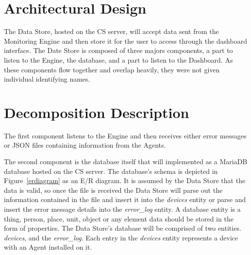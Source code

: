 \documentclass[letterpaper,12pt,oneside,listof=totoc]{scrreprt}
\begin{document}
\section{Architectural Design}
The Data Store, hosted on the CS server, will accept data sent from the Monitoring Engine and then store it for the user to access through the dashboard interface. 
The Date Store is composed of three majors components, a part to listen to the Engine, the database, and a part to listen to the Dashboard. As these components flow together and overlap heavily, they were not given individual identifying names. 


\section{Decomposition Description}
The first component listens to the Engine and then receives either error messages or JSON files containing information from the Agents. 

The second component is the database itself that will implemented as a MariaDB database hosted on the CS server. The database's schema is depicted in Figure~\ref{erdiagram} as an E/R diagram.
It is assumed by the Data Store that the data is valid, so once the file is received the Data Store will parse out the information contained in the file and insert it into the \textit{devices} entity or parse and insert the error message details into the \textit{error_log} entity. A database entity is a thing, person, place, unit, object or any element data should be stored in the form of properties. The Data Store's database will be comprised of two entities. \textit{devices}, and the \textit{error_log}. Each entry in the \textit{devices} entity represents a device with an Agent installed on it. 
\end{document}
